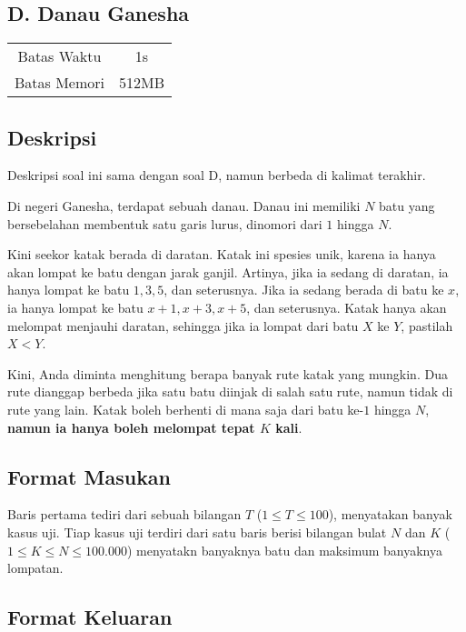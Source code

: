 \documentclass{article}
\begin{document}
\begin{center}
    \section*{D. Danau Ganesha}

    \begin{tabular}{ | c c | }
        \hline
        Batas Waktu  & 1s \\
        Batas Memori & 512MB \\
        \hline
    \end{tabular}
\end{center}

\subsection*{Deskripsi}

Deskripsi soal ini sama dengan soal D, namun berbeda di kalimat terakhir.

Di negeri Ganesha, terdapat sebuah danau.
Danau ini memiliki $N$ batu yang bersebelahan membentuk satu garis lurus, dinomori dari $1$ hingga $N$.

Kini seekor katak berada di daratan.
Katak ini spesies unik, karena ia hanya akan lompat ke batu dengan jarak ganjil.
Artinya, jika ia sedang di daratan, ia hanya lompat ke batu $1, 3, 5$, dan seterusnya.
Jika ia sedang berada di batu ke $x$, ia hanya lompat ke batu $x+1, x+3, x+5$, dan seterusnya.
Katak hanya akan melompat menjauhi daratan, sehingga jika ia lompat dari batu $X$ ke $Y$, pastilah $X < Y$.

Kini, Anda diminta menghitung berapa banyak rute katak yang mungkin.
Dua rute dianggap berbeda jika satu batu diinjak di salah satu rute, namun tidak di rute yang lain.
Katak boleh berhenti di mana saja dari batu ke-$1$ hingga $N$, \textbf{namun ia hanya boleh melompat tepat $K$ kali}.

\subsection*{Format Masukan}

Baris pertama tediri dari sebuah bilangan $T$ ($1 \leq T \leq 100$), menyatakan banyak kasus uji.
Tiap kasus uji terdiri dari satu baris berisi bilangan bulat $N$ dan $K$ ($1 \leq K \leq N \leq 100.000$) menyatakn banyaknya batu dan maksimum banyaknya lompatan.

\subsection*{Format Keluaran}
\end{document}
